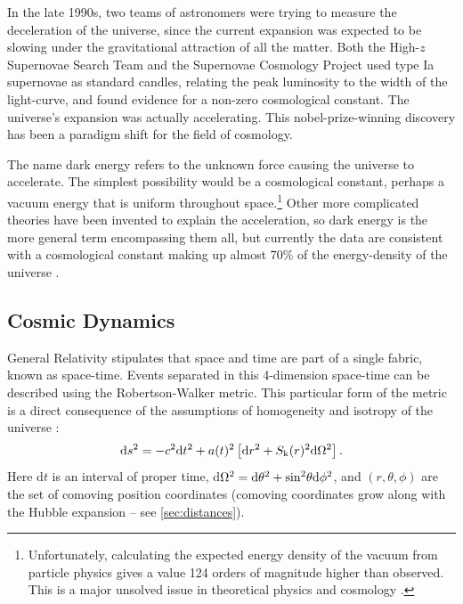 In the late 1990s, two teams of astronomers were trying to measure the deceleration of the universe, since the current expansion was expected to be slowing under the gravitational attraction of all the matter. Both the High-$z$ Supernovae Search Team \citep{Riess98} and the Supernovae Cosmology Project \citep{Perlmutter99} used type Ia supernovae as standard candles, relating the peak luminosity to the width of the light-curve, and found evidence for a non-zero cosmological constant. The universe's expansion was actually accelerating. This nobel-prize-winning discovery has been a paradigm shift for the field of cosmology.

The name dark energy refers to the unknown force causing the universe to accelerate. The simplest possibility would be a cosmological constant, perhaps a vacuum energy that is uniform throughout space.\footnote{Unfortunately, calculating the expected energy density of the vacuum from particle physics gives a value 124 orders of magnitude higher than observed. This is a major unsolved issue in theoretical physics and cosmology \citep{RydenText}.} Other more complicated theories have been invented to explain the acceleration, so dark energy is the more general term encompassing them all, but currently the data are consistent with a cosmological constant making up almost 70\% of the energy-density of the universe \citep{PlanckXVI}.

\subsection{Cosmic Dynamics}
\label{sec:Dynamics}

General Relativity stipulates that space and time are part of a single fabric, known as space-time. Events separated in this 4-dimension space-time can be described using the Robertson-Walker metric. This particular form of the metric is a direct consequence of the assumptions of homogeneity and isotropy of the universe \citep{Bertone05}:
\begin{equation}
{\rm d}s^2 = -c^2 {\rm d}t^2 +a(t)^2 \left[{\rm d}r^2 + S_{\rm k}(r)^2{\rm d}\Omega^2\right].
\label{eq:metric}
\end{equation}
Here d$t$ is an interval of proper time, d$\Omega^2 = {\rm d}\theta^2 + {\rm sin}^2\theta {\rm d}\phi^2$, and $(r,\theta,\phi)$ are the set of comoving position coordinates (comoving coordinates grow along with the Hubble expansion -- see \autoref{sec:distances}). 

